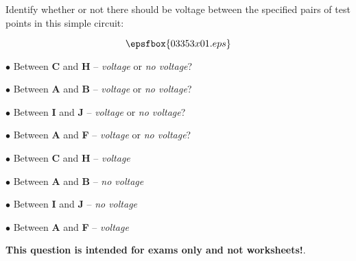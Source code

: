 

Identify whether or not there should be voltage between the specified pairs of test points in this simple circuit:

$$\epsfbox{03353x01.eps}$$

\medskip
\item{$\bullet$} Between {\bf C} and {\bf H} -- {\it voltage} or {\it no voltage}?
\item{$\bullet$} Between {\bf A} and {\bf B} -- {\it voltage} or {\it no voltage}?
\item{$\bullet$} Between {\bf I} and {\bf J} -- {\it voltage} or {\it no voltage}?
\item{$\bullet$} Between {\bf A} and {\bf F} -- {\it voltage} or {\it no voltage}?
\medskip







\medskip
\item{$\bullet$} Between {\bf C} and {\bf H} -- {\it voltage} 
\item{$\bullet$} Between {\bf A} and {\bf B} -- {\it no voltage}
\item{$\bullet$} Between {\bf I} and {\bf J} -- {\it no voltage}
\item{$\bullet$} Between {\bf A} and {\bf F} -- {\it voltage}
\medskip







{\bf This question is intended for exams only and not worksheets!}.



